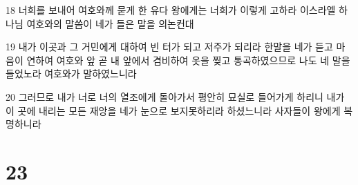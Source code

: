 \par 18 너희를 보내어 여호와께 묻게 한 유다 왕에게는 너희가 이렇게 고하라 이스라엘 하나님 여호와의 말씀이 네가 들은 말을 의논컨대
\par 19 내가 이곳과 그 거민에게 대하여 빈 터가 되고 저주가 되리라 한말을 네가 듣고 마음이 연하여 여호와 앞 곧 내 앞에서 겸비하여 옷을 찢고 통곡하였으므로 나도 네 말을 들었노라 여호와가 말하였느니라
\par 20 그러므로 내가 너로 너의 열조에게 돌아가서 평안히 묘실로 들어가게 하리니 내가 이 곳에 내리는 모든 재앙을 네가 눈으로 보지못하리라 하셨느니라 사자들이 왕에게 복명하니라

\chapter{23}

